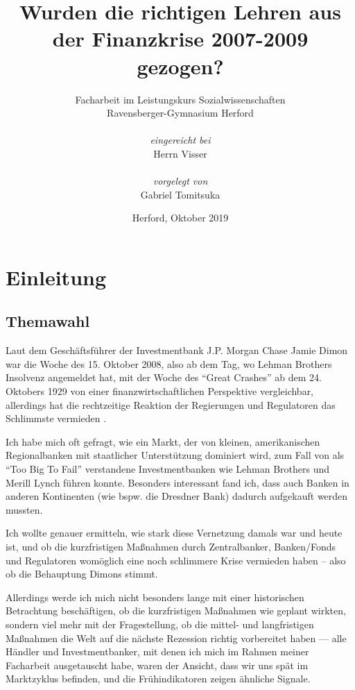 \documentclass[a4paper,draft,11pt]{report}
\begin{document}
\title{Wurden die richtigen Lehren aus der
    Finanzkrise 2007-2009 gezogen?}
\author{%
    Facharbeit im Leistungskurs Sozialwissenschaften \\
    Ravensberger-Gymnasium Herford \\ \\
    \textit{eingereicht bei} \\
    Herrn Visser \\ \\
    \textit{vorgelegt von} \\
    Gabriel Tomitsuka 
    }
\date{Herford, Oktober 2019}
\maketitle
\tableofcontents
\newpage
\chapter{Einleitung}
\section{Themawahl}
Laut dem Gesch\"aftsf\"uhrer der Investmentbank J.P. Morgan
Chase Jamie Dimon war die Woche des 15. Oktober 2008, also ab dem
Tag, wo Lehman Brothers Insolvenz angemeldet hat,
mit der Woche des \enquote{Great Crashes} ab dem 24. Oktobers 1929
von einer finanzwirtschaftlichen Perspektive vergleichbar,
allerdings hat die rechtzeitige Reaktion der Regierungen und
Regulatoren das Schlimmste vermieden \parencite{dimonyt}.

Ich habe mich oft gefragt, wie ein Markt, der
von kleinen, amerikanischen Regionalbanken mit
staatlicher Unterstützung
dominiert wird, zum Fall von als \enquote{Too Big To
Fail} verstandene Investmentbanken wie Lehman
Brothers und Merill Lynch
führen konnte. Besonders interessant fand ich,
dass auch Banken in anderen Kontinenten (wie
bspw. die Dresdner Bank) dadurch
aufgekauft werden mussten.

Ich wollte genauer
ermitteln, wie stark diese Vernetzung damals
war und heute ist, und ob
die kurzfristigen Maßnahmen durch
Zentralbanker, Banken/Fonds und Regulatoren
womöglich eine noch schlimmere Krise
vermieden haben -- also ob die Behauptung Dimons
stimmt.

Allerdings werde ich mich nicht besonders
lange mit einer historischen Betrachtung
beschäftigen, ob die kurzfristigen
Maßnahmen wie geplant wirkten, sondern viel
mehr mit der Fragestellung, ob die mittel- und
langfristigen Maßnahmen die Welt
auf die nächste Rezession richtig vorbereitet
haben --- alle Händler und Investmentbanker, mit
denen ich mich im Rahmen meiner Facharbeit ausgetauscht habe, waren
der Ansicht, dass wir uns spät im Marktzyklus
befinden, und die Frühindikatoren zeigen
ähnliche Signale.
\end{document}
